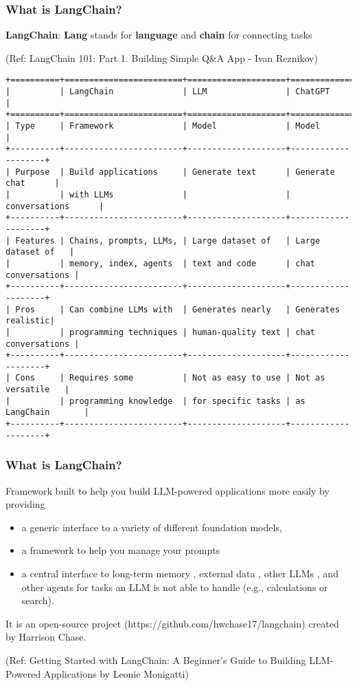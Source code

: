 \begin{frame}[fragile]\frametitle{What is LangChain?}

\textbf{LangChain}: {\bf Lang} stands for {\bf language} and {\bf chain} for connecting tasks


{\tiny (Ref: LangChain 101: Part 1. Building Simple Q\&A App - Ivan Reznikov)}

\begin{lstlisting}
+==========+========================+====================+====================+
|          | LangChain              | LLM                | ChatGPT            | 
+==========+========================+====================+====================+
| Type     | Framework              | Model              | Model              | 
+----------+------------------------+--------------------+--------------------+
| Purpose  | Build applications     | Generate text      | Generate chat      | 
|          | with LLMs              |                    | conversations      | 
+----------+------------------------+--------------------+--------------------+
| Features | Chains, prompts, LLMs, | Large dataset of   | Large dataset of   | 
|          | memory, index, agents  | text and code      | chat conversations | 
+----------+------------------------+--------------------+--------------------+
| Pros     | Can combine LLMs with  | Generates nearly   | Generates realistic| 
|          | programming techniques | human-quality text | chat conversations | 
+----------+------------------------+--------------------+--------------------+
| Cons     | Requires some          | Not as easy to use | Not as versatile   | 
|          | programming knowledge  | for specific tasks | as LangChain       | 
+----------+------------------------+--------------------+--------------------+
\end{lstlisting}
\end{frame}


\begin{frame}[fragile]\frametitle{What is LangChain?}

Framework built to help you build LLM-powered applications more easily by providing 

\begin{itemize}
\item a generic interface to a variety of different foundation models,
\item a framework to help you manage your prompts 
\item a central interface to long-term memory , external data , other LLMs , and other agents for tasks an LLM is not able to handle (e.g., calculations or search).
\end{itemize}

It is an open-source project (https://github.com/hwchase17/langchain) created by Harrison Chase.

{\tiny (Ref: Getting Started with LangChain: A Beginner’s Guide to Building LLM-Powered Applications by Leonie Monigatti)}
\end{frame}



